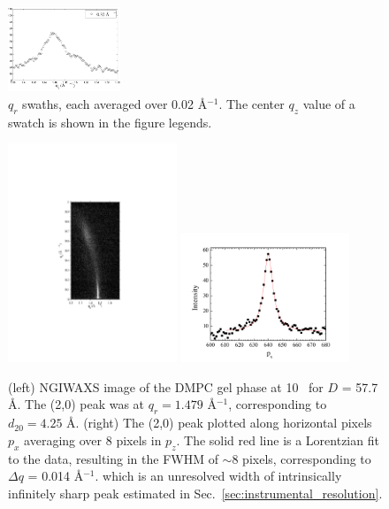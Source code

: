 \begin{figure}[htbp]
  \includegraphics[width=0.3\textwidth]{figures/ripple/NGIWAXS/qrplot14}
  \caption{$q_r$ swaths, each averaged over 0.02 \AA$^{-1}$. 
  The center $q_z$ value of a swatch is shown in the figure legends.}
  \label{fig:qrplots}
\end{figure}

\begin{figure}[htbp]
  \centering
  \includegraphics[trim=150 190 150 180,clip,width=0.45\textwidth]{figures/ripple/NGIWAXS/dmpc1_107}
  \includegraphics[trim=50 0 50 0,clip,width=0.45\textwidth]{figures/ripple/NGIWAXS/dmpc1_107_gel_phase_20_swath_8px}
  \caption[NGIWAXS of the DMPC gel phase]{(left) NGIWAXS image of the DMPC gel phase
  at 10 \textcelsius\ for $D$ = 57.7 \AA. The (2,0) peak was at
  $q_r=1.479$ \AA$^{-1}$, corresponding to $d_{20}=4.25$ \AA.
  (right) The (2,0) peak plotted along horizontal pixels $p_x$ averaging over 8
  pixels in $p_z$. The solid red
  line is a Lorentzian fit to the data, resulting in the FWHM of $\sim$8 pixels,
  corresponding to $\Delta q$ = 0.014 \AA$^{-1}$.
  which is an unresolved width of intrinsically infinitely sharp peak
  estimated in Sec.~\ref{sec:instrumental_resolution}.}
  \label{fig:gel_phase}  
\end{figure}
  
